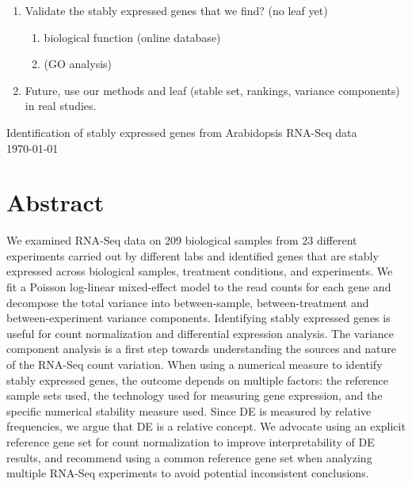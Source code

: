 \documentclass[letterpaper,12pt]{article}
\begin{document}
\begin{enumerate}
    \item
	Validate the stably expressed genes that we find? (no leaf yet) 
	\begin{enumerate}
	    \item
		biological function (online database) 
	    \item
		(GO analysis)
	\end{enumerate}

    \item
	Future, use our methods and leaf (stable set, rankings, variance
	components) in real studies.
\end{enumerate}

\newpage

\begin{center}
{\Large Identification of stably expressed genes from Arabidopsis RNA-Seq data}\\

\today

\end{center}


\newpage
\section*{Abstract}
We examined RNA-Seq data on 209 biological samples from 23 different
experiments carried out by different labs and identified genes that are stably
expressed across biological samples, treatment conditions, and experiments. We
fit a Poisson log-linear mixed-effect model to the read counts for each gene
and decompose the total variance into between-sample, between-treatment and
between-experiment variance components. Identifying stably expressed genes is
useful for count normalization and differential expression analysis. The
variance component analysis is a first step towards understanding the sources
and nature of the RNA-Seq count variation.
When using a numerical measure to identify stably expressed genes, the outcome
depends on multiple factors: the reference sample sets used, the technology
used for measuring gene expression, and the specific numerical stability
measure used.  Since DE is measured by relative frequencies, we argue that DE
is a relative concept. We advocate using an explicit reference gene set for
count normalization to improve interpretability of DE results, and recommend
using a common reference gene set when analyzing multiple RNA-Seq experiments
to avoid potential inconsistent conclusions.
\end{document}
